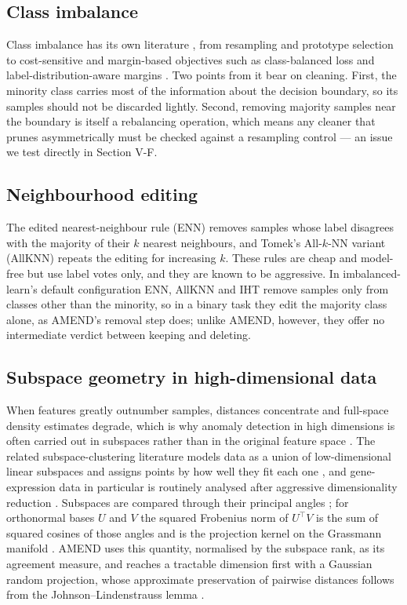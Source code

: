 \documentclass[conference]{IEEEtran}
\begin{document}
\subsection{Class imbalance}\label{sec:class-imbalance}

Class imbalance has its own literature \cite{he2009,johnson2019}, from resampling and prototype selection \cite{garcia2012,garcia2015} to cost-sensitive and margin-based objectives such as class-balanced loss \cite{cui2019} and label-distribution-aware margins \cite{cao2019}. Two points from it bear on cleaning. First, the minority class carries most of the information about the decision boundary, so its samples should not be discarded lightly. Second, removing majority samples near the boundary is itself a rebalancing operation, which means any cleaner that prunes asymmetrically must be checked against a resampling control --- an issue we test directly in Section V-F.

\subsection{Neighbourhood editing}\label{sec:neighbourhood-editing}

The edited nearest-neighbour rule (ENN) \cite{wilson1972} removes samples whose label disagrees with the majority of their $k$ nearest neighbours, and Tomek's All-$k$-NN variant (AllKNN) \cite{tomek1976} repeats the editing for increasing $k$. These rules are cheap and model-free but use label votes only, and they are known to be aggressive. In imbalanced-learn's default configuration \cite{lemaitre2017} ENN, AllKNN and IHT remove samples only from classes other than the minority, so in a binary task they edit the majority class alone, as AMEND's removal step does; unlike AMEND, however, they offer no intermediate verdict between keeping and deleting.

\subsection{Subspace geometry in high-dimensional data}\label{sec:subspace-geometry-in-high-dimensional-data}

When features greatly outnumber samples, distances concentrate and full-space density estimates degrade, which is why anomaly detection in high dimensions is often carried out in subspaces rather than in the original feature space \cite{zimek2012,kriegel2009}. The related subspace-clustering literature models data as a union of low-dimensional linear subspaces and assigns points by how well they fit each one \cite{elhamifar2013}, and gene-expression data in particular is routinely analysed after aggressive dimensionality reduction \cite{bolon2014}. Subspaces are compared through their principal angles \cite{bjorck1973}; for orthonormal bases $U$ and $V$ the squared Frobenius norm of $U^{\top}V$ is the sum of squared cosines of those angles and is the projection kernel on the Grassmann manifold \cite{hamm2008}. AMEND uses this quantity, normalised by the subspace rank, as its agreement measure, and reaches a tractable dimension first with a Gaussian random projection, whose approximate preservation of pairwise distances follows from the Johnson--Lindenstrauss lemma \cite{johnson1984}.
\end{document}
